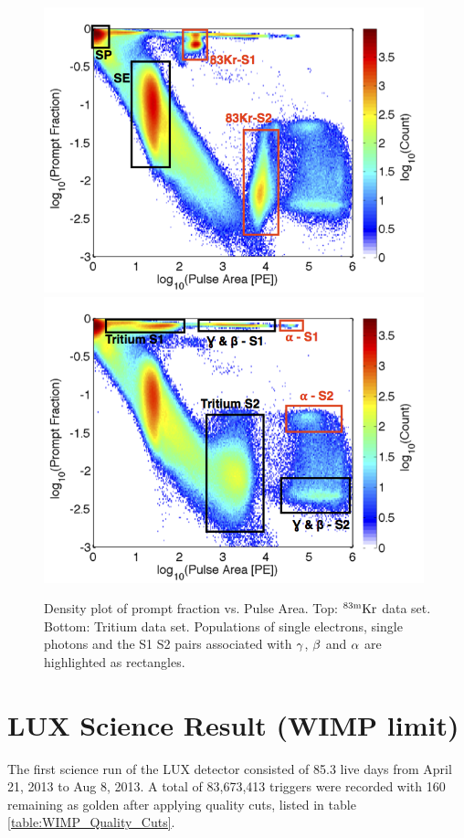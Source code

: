  \begin{figure}[h!]\centering
\includegraphics[width=110mm]{Chapter_LUX_Det/Kr_83_Density_text.png}
\includegraphics[width=110mm]{Chapter_LUX_Det/T_Density_text.png}
\caption{Density plot of prompt fraction vs. Pulse Area. Top: $\rm^{83m}Kr$ data set. Bottom: Tritium data set. Populations of single electrons, single photons and the S1 S2 pairs associated with $\rm \gamma$, $\rm \beta$ and $\rm \alpha$ are highlighted as rectangles.}
\label{fig:Prompt_Fraction}
\end{figure}


\section{LUX Science Result (WIMP limit)}

The first science run of the LUX detector consisted of 85.3 live days from April 21, 2013 to Aug 8, 2013. A total of 83,673,413 triggers were recorded with 160 remaining as golden after applying quality cuts, listed in table \ref{table:WIMP_Quality_Cuts}.  

